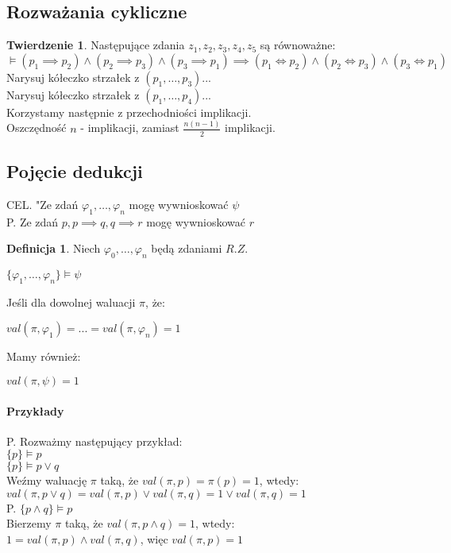 \documentclass{article}
\theoremstyle{definition}
\newtheorem{de}{Definicja}[subsection]
\theoremstyle{definition}
\newtheorem{tw}{Twierdzenie}[subsection]
\theoremstyle{definition}
\theoremstyle{definition}
\begin{document}
\subsection{Rozważania cykliczne}
\begin{tw}
    Następujące zdania $z_1,z_2,z_3,z_4,z_5$ są równoważne:\\
    $\models (p_1\implies p_2)\land(p_2\implies p_3)\land(p_3\implies p_1)\implies(p_1\iff p_2)\land(p_2\iff p_3)\land(p_3\iff p_1)$\\
    Narysuj kółeczko strzałek z $(p_1,\dots,p_3)$...\\
    Narysuj kółeczko strzałek z $(p_1,\dots,p_4)$...\\
    Korzystamy następnie z przechodniości implikacji.\\
    Oszczędność $n$ - implikacji, zamiast $\frac{n(n-1)}{2}$ implikacji.
\end{tw}

\subsection{Pojęcie dedukcji}
CEL. "Ze zdań $\varphi_1,\dots,\varphi_n$ mogę wywnioskować $\psi$\\
P. Ze zdań $p, p\implies q, q\implies r$ mogę wywnioskować $r$

\begin{de}
    Niech $\varphi_0, \dots, \varphi_n$ będą zdaniami $R.Z$.\\
    \begin{center}
    $\{\varphi_1,\dots, \varphi_n\}\models \psi$
    \end{center}
    Jeśli dla dowolnej waluacji $\pi$, że:
    \begin{center}
    $val(\pi, \varphi_1)=...=val(\pi,\varphi_n)=1$
    \end{center}
    Mamy również:
    \begin{center}
    $val(\pi,\psi)=1$
    \end{center}
\end{de}

\paragraph{Przykłady}
P. Rozważmy następujący przykład:\\
$\{p\}\models p$\\
$\{p\}\models p\lor q$\\
Weźmy waluację $\pi$ taką, że $val(\pi,p)=\pi(p)=1$, wtedy:\\
$val(\pi,p\lor q)=val(\pi,p)\lor val(\pi,q)=1\lor val(\pi,q)=1$\\
P. $\{p\land q\}\models p$\\
Bierzemy $\pi$ taką, że $val(\pi, p\land q)=1$, wtedy:\\
$1=val(\pi,p)\land val(\pi, q)$, więc $val(\pi, p)=1$
\end{document}
